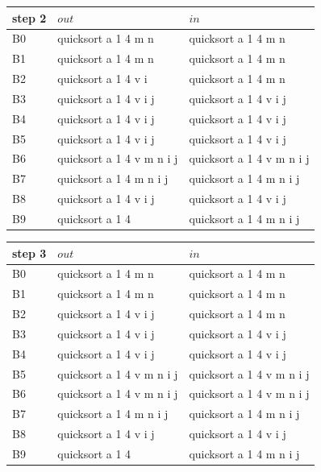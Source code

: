 \begin{tabular}{|l|l|l|} \hline
step 2  & $out$             & $in$      \\ \hline
B0 & quicksort a 1 4 m n       & quicksort a 1 4 m n        \\ \hline
B1 & quicksort a 1 4 m n       & quicksort a 1 4 m n        \\ \hline
B2 & quicksort a 1 4 v i       & quicksort a 1 4 m n        \\ \hline
B3 & quicksort a 1 4 v i j     & quicksort a 1 4 v i j      \\ \hline
B4 & quicksort a 1 4 v i j     & quicksort a 1 4 v i j      \\ \hline
B5 & quicksort a 1 4 v i j     & quicksort a 1 4 v i j      \\ \hline
B6 & quicksort a 1 4 v m n i j & quicksort a 1 4 v m n i j  \\ \hline
B7 & quicksort a 1 4 m n i j   & quicksort a 1 4 m n i j  \\ \hline
B8 & quicksort a 1 4 v i j     & quicksort a 1 4 v i j  \\ \hline
B9 & quicksort a 1 4           & quicksort a 1 4 m n i j \\ \hline
\end{tabular}

\begin{tabular}{|l|l|l|} \hline
step 3  & $out$             & $in$      \\ \hline
B0 & quicksort a 1 4 m n       & quicksort a 1 4 m n        \\ \hline
B1 & quicksort a 1 4 m n       & quicksort a 1 4 m n        \\ \hline
B2 & quicksort a 1 4 v i j     & quicksort a 1 4 m n        \\ \hline
B3 & quicksort a 1 4 v i j     & quicksort a 1 4 v i j      \\ \hline
B4 & quicksort a 1 4 v i j     & quicksort a 1 4 v i j      \\ \hline
B5 & quicksort a 1 4 v m n i j & quicksort a 1 4 v m n i j  \\ \hline
B6 & quicksort a 1 4 v m n i j & quicksort a 1 4 v m n i j  \\ \hline
B7 & quicksort a 1 4 m n i j   & quicksort a 1 4 m n i j  \\ \hline
B8 & quicksort a 1 4 v i j     & quicksort a 1 4 v i j  \\ \hline
B9 & quicksort a 1 4           & quicksort a 1 4 m n i j \\ \hline
\end{tabular}

